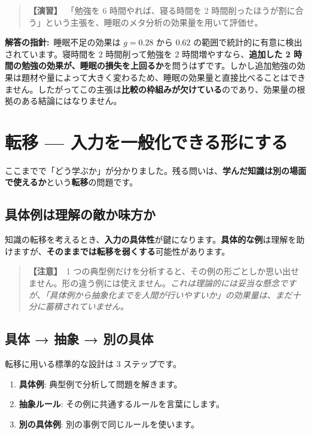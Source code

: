 \documentclass{article}
\begin{document}
\begin{quote}
\textbf{【演習】}\ 「勉強を 6 時間やれば、寝る時間を 2 時間削ったほうが割に合う」という主張を、睡眠のメタ分析の効果量を用いて評価せ。
\end{quote}

\textbf{解答の指針:}\ 睡眠不足の効果は \(g = 0.28\) から \(0.62\) の範囲で統計的に有意に検出されています。寝時間を 2 時間削って勉強を 2 時間増やすなら、\textbf{追加した 2 時間の勉強の効果が、睡眠の損失を上回るか}を問うはずです。しかし追加勉強の効果は題材や量によって大きく変わるため、睡眠の効果量と直接比べることはできません。したがってこの主張は\textbf{比較の枠組みが欠けている}のであり、効果量の根拠のある結論にはなりません。

\section{転移 — 入力を一般化できる形にする}

ここまでで「どう学ぶか」が分かりました。残る問いは、\textbf{学んだ知識は別の場面で使えるか}という\textbf{転移}の問題です。

\subsection{具体例は理解の敵か味方か}

知識の転移を考えるとき、\textbf{入力の具体性}が鍵になります。\textbf{具体的な例}は理解を助けますが、\textbf{そのままでは転移を弱くする}可能性があります。

\begin{quote}
\textbf{【注意】}\ 1 つの典型例だけを分析すると、その例の形ごとしか思い出せません。形の違う例には使えません。\emph{これは理論的には妥当な懸念ですが、「具体例から抽象化までを人間が行いやすいか」の効果量は、まだ十分に蓄積されていません。}
\end{quote}

\subsection{具体 → 抽象 → 別の具体}

転移に用いる標準的な設計は 3 ステップです。

\begin{enumerate}
\item \textbf{具体例}: 典型例で分析して問題を解きます。
\item \textbf{抽象ルール}: その例に共通するルールを言葉にします。
\item \textbf{別の具体例}: 別の事例で同じルールを使います。
\end{enumerate}
\end{document}
